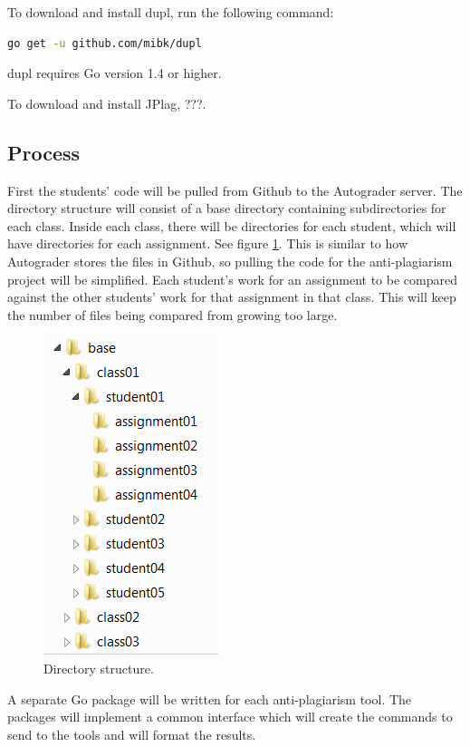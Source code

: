 \documentclass[12pt]{article}
\begin{document}
			To download and install dupl, run the following command:
			\begin{lstlisting}[language=bash]
	go get -u github.com/mibk/dupl
			\end{lstlisting}
			\noindent dupl requires Go version 1.4 or higher.
			
			To download and install JPlag, ???.
			
		\subsection{Process}
			First the students' code will be pulled from Github to the Autograder server. The directory structure will consist of a base directory containing subdirectories for each class. Inside each class, there will be directories for each student, which will have directories for each assignment. See figure \ref{fig:directories}. This is similar to how Autograder stores the files in Github, so pulling the code for the anti-plagiarism project will be simplified. Each student's work for an assignment to be compared against the other students' work for that assignment in that class. This will keep the number of files being compared from growing too large. 
			
			\begin{figure}[h!]
				\includegraphics[scale=0.75]{Directories.png}
				\caption{Directory structure.}
				\label{fig:directories}
			\end{figure}
			
			A separate Go package will be written for each anti-plagiarism tool. The packages will implement a common interface which will create the commands to send to the tools and will format the results.
			
\end{document}
